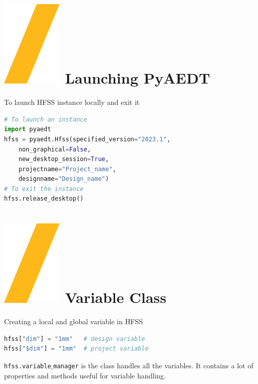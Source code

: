 \documentclass[9pt,landscape]{article}
\begin{document}
\begin{multicols}{3}
\setlength{\premulticols}{1pt}
\setlength{\postmulticols}{1pt}
\setlength{\multicolsep}{1pt}
\setlength{\columnsep}{2pt}

\section{\includegraphics[height=\fontcharht\font`\S]{slash.png} Launching PyAEDT}
To launch HFSS instance locally and exit it
\begin{lstlisting}[language=Python]
# To launch an instance
import pyaedt
hfss = pyaedt.Hfss(specified_version="2023.1",
	non_graphical=False,
	new_desktop_session=True,
	projectname="Project_name",
	designname="Design_name")
# To exit the instance
hfss.release_desktop()
\end{lstlisting}



\section{\includegraphics[height=\fontcharht\font`\S]{slash.png} Variable Class}
Creating a local and global variable in HFSS
\begin{lstlisting}[language=Python]
hfss["dim"] = "1mm"   # design variable
hfss["$dim"] = "1mm"  # project variable
\end{lstlisting}
\texttt{hfss.variable$\_$manager} is the class handles all the variables. It contains a lot of properties and methods useful for variable handling.

\end{multicols}
\end{document}
